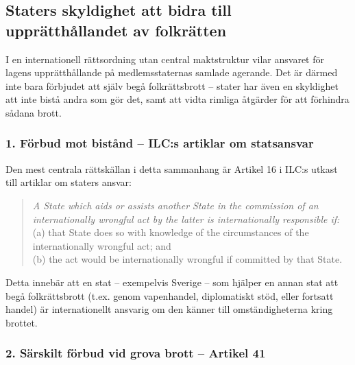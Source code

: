 %

\subsection{Staters skyldighet att bidra till upprätthållandet av folkrätten}

I en internationell rättsordning utan central maktstruktur vilar ansvaret för 
lagens upprätthållande på medlemsstaternas samlade agerande. Det är därmed inte bara förbjudet att 
själv begå folkrättsbrott – stater har även en skyldighet att inte bistå andra som gör det, 
samt att vidta rimliga åtgärder för att förhindra sådana brott.

\subsubsection*{1. Förbud mot bistånd – ILC:s artiklar om statsansvar}

Den mest centrala rättskällan i detta sammanhang är Artikel 16 i ILC:s utkast till artiklar om staters ansvar:

\begin{quote}
\textit{A State which aids or assists another State in the commission of an internationally wrongful act by the latter is internationally responsible if:}\\
(a) that State does so with knowledge of the circumstances of the internationally wrongful act; and\\
(b) the act would be internationally wrongful if committed by that State.
\end{quote}

Detta innebär att en stat – exempelvis Sverige – som hjälper en annan stat att begå folkrättsbrott 
(t.ex. genom vapenhandel, diplomatiskt stöd, eller fortsatt handel) är internationellt 
ansvarig om den känner till omständigheterna kring brottet.

\subsubsection*{ 2. Särskilt förbud vid grova brott – Artikel 41}

